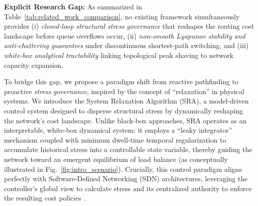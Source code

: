 \documentclass[journal]{IEEEtran}
\theoremstyle{plain}
\theoremstyle{definition}
\newcommand{\rev}[1]{{\color{blue}#1}}
\begin{document}
\rev{\textbf{Explicit Research Gap:} As summarized in Table~\ref{tab:related_work_comparison}, no existing framework simultaneously provides (i) \textit{closed-loop structural stress governance} that reshapes the routing cost landscape before queue overflows occur, (ii) \textit{non-smooth Lyapunov stability and anti-chattering guarantees} under discontinuous shortest-path switching, and (iii) \textit{white-box analytical tractability} linking topological peak shaving to network capacity expansion.}

To bridge this gap, we propose a paradigm shift from reactive pathfinding to proactive \textit{stress governance}, inspired by the concept of ``relaxation'' in physical systems.
We introduce the System Relaxation Algorithm (SRA), a model-driven control system designed to disperse structural stress by dynamically reshaping the network's cost landscape.
Unlike black-box approaches, SRA operates as an interpretable, white-box dynamical system: it employs a ``leaky integrator'' mechanism \rev{coupled with minimum dwell-time temporal regularization} to accumulate historical stress into a controllable state variable, thereby guiding the network toward an emergent equilibrium of load balance (as conceptually illustrated in Fig.~\ref{fig:intro_scenario}).
Crucially, this control paradigm aligns perfectly with Software-Defined Networking (SDN) architectures, leveraging the controller's global view to calculate stress and its centralized authority to enforce the resulting cost policies \cite{hou2020reliable}.
\end{document}
